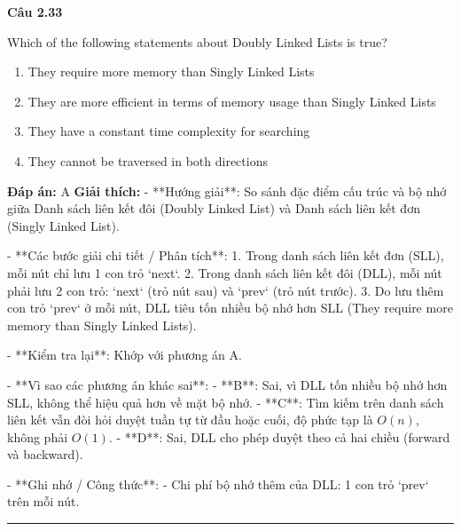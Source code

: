 \documentclass[11pt,a4paper]{article}
\newenvironment{question}[1]{%
  \par\vspace{1em}\noindent\textbf{\large Câu #1}\par\vspace{0.4em}
}{%
  \par\vspace{1em}\hrule\vspace{0.6em}
}
\newenvironment{choices}{%
  \begin{enumerate}[label=\textbf{\Alph*.},leftmargin=2.2em,itemsep=2pt,topsep=3pt]
}{%
  \end{enumerate}
}
\newcommand{\choice}{\item}
\begin{document}
\begin{question}{2.33}
Which of the following statements about Doubly Linked Lists is true?
\begin{choices}
\choice They require more memory than Singly Linked Lists
\choice They are more efficient in terms of memory usage than Singly Linked Lists
\choice They have a constant time complexity for searching
\choice They cannot be traversed in both directions
\end{choices}
\textbf{Đáp án:} A
\textbf{Giải thích:} - **Hướng giải**:
  So sánh đặc điểm cấu trúc và bộ nhớ giữa Danh sách liên kết đôi (Doubly Linked List) và Danh sách liên kết đơn (Singly Linked List).

- **Các bước giải chi tiết / Phân tích**:
  1. Trong danh sách liên kết đơn (SLL), mỗi nút chỉ lưu 1 con trỏ `next`.
  2. Trong danh sách liên kết đôi (DLL), mỗi nút phải lưu 2 con trỏ: `next` (trỏ nút sau) và `prev` (trỏ nút trước).
  3. Do lưu thêm con trỏ `prev` ở mỗi nút, DLL tiêu tốn nhiều bộ nhớ hơn SLL (They require more memory than Singly Linked Lists).

- **Kiểm tra lại**:
  Khớp với phương án A.

- **Vì sao các phương án khác sai**:
  - **B**: Sai, vì DLL tốn nhiều bộ nhớ hơn SLL, không thể hiệu quả hơn về mặt bộ nhớ.
  - **C**: Tìm kiếm trên danh sách liên kết vẫn đòi hỏi duyệt tuần tự từ đầu hoặc cuối, độ phức tạp là \(O(n)\), không phải \(O(1)\).
  - **D**: Sai, DLL cho phép duyệt theo cả hai chiều (forward và backward).

- **Ghi nhớ / Công thức**:
  - Chi phí bộ nhớ thêm của DLL: 1 con trỏ `prev` trên mỗi nút.
\end{question}
\end{document}
